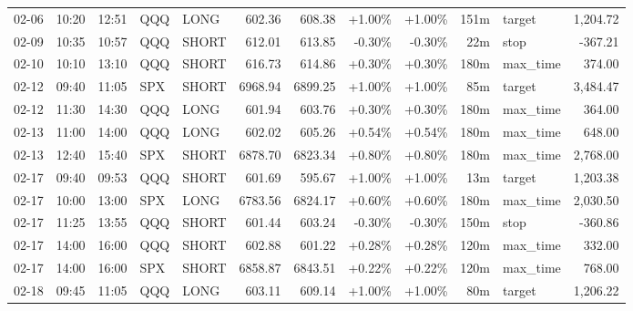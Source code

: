 \documentclass[11pt,a4paper,twoside]{article}
\begin{document}
\begin{center}
\begin{longtable}{>{\color{txtmain}}l l l l l r r r r r >{\color{txtmain}}l r}
02-06 & 10:20 & 12:51 & QQQ & LONG & 602.36 & 608.38 & \textcolor{wingreen}{+1.00\%} & \textcolor{wingreen}{+1.00\%} & 151m & target & \textcolor{wingreen}{1,204.72} \\
02-09 & 10:35 & 10:57 & QQQ & SHORT & 612.01 & 613.85 & \textcolor{lossred}{-0.30\%} & \textcolor{lossred}{-0.30\%} & 22m & stop & \textcolor{lossred}{-367.21} \\
02-10 & 10:10 & 13:10 & QQQ & SHORT & 616.73 & 614.86 & \textcolor{wingreen}{+0.30\%} & \textcolor{wingreen}{+0.30\%} & 180m & max\_time & \textcolor{wingreen}{374.00} \\
02-12 & 09:40 & 11:05 & SPX & SHORT & 6968.94 & 6899.25 & \textcolor{wingreen}{+1.00\%} & \textcolor{wingreen}{+1.00\%} & 85m & target & \textcolor{wingreen}{3,484.47} \\
02-12 & 11:30 & 14:30 & QQQ & LONG & 601.94 & 603.76 & \textcolor{wingreen}{+0.30\%} & \textcolor{wingreen}{+0.30\%} & 180m & max\_time & \textcolor{wingreen}{364.00} \\
02-13 & 11:00 & 14:00 & QQQ & LONG & 602.02 & 605.26 & \textcolor{wingreen}{+0.54\%} & \textcolor{wingreen}{+0.54\%} & 180m & max\_time & \textcolor{wingreen}{648.00} \\
02-13 & 12:40 & 15:40 & SPX & SHORT & 6878.70 & 6823.34 & \textcolor{wingreen}{+0.80\%} & \textcolor{wingreen}{+0.80\%} & 180m & max\_time & \textcolor{wingreen}{2,768.00} \\
02-17 & 09:40 & 09:53 & QQQ & SHORT & 601.69 & 595.67 & \textcolor{wingreen}{+1.00\%} & \textcolor{wingreen}{+1.00\%} & 13m & target & \textcolor{wingreen}{1,203.38} \\
02-17 & 10:00 & 13:00 & SPX & LONG & 6783.56 & 6824.17 & \textcolor{wingreen}{+0.60\%} & \textcolor{wingreen}{+0.60\%} & 180m & max\_time & \textcolor{wingreen}{2,030.50} \\
02-17 & 11:25 & 13:55 & QQQ & SHORT & 601.44 & 603.24 & \textcolor{lossred}{-0.30\%} & \textcolor{lossred}{-0.30\%} & 150m & stop & \textcolor{lossred}{-360.86} \\
02-17 & 14:00 & 16:00 & QQQ & SHORT & 602.88 & 601.22 & \textcolor{wingreen}{+0.28\%} & \textcolor{wingreen}{+0.28\%} & 120m & max\_time & \textcolor{wingreen}{332.00} \\
02-17 & 14:00 & 16:00 & SPX & SHORT & 6858.87 & 6843.51 & \textcolor{wingreen}{+0.22\%} & \textcolor{wingreen}{+0.22\%} & 120m & max\_time & \textcolor{wingreen}{768.00} \\
02-18 & 09:45 & 11:05 & QQQ & LONG & 603.11 & 609.14 & \textcolor{wingreen}{+1.00\%} & \textcolor{wingreen}{+1.00\%} & 80m & target & \textcolor{wingreen}{1,206.22} \\

\end{longtable}
\end{center}
\end{document}
